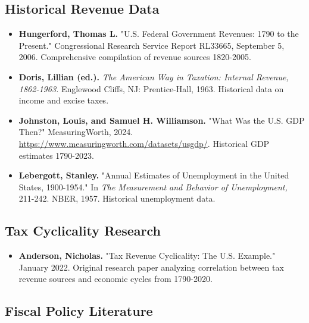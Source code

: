\documentclass[12pt,letterpaper]{article}
\begin{document}
\subsection{Historical Revenue Data}

\begin{itemize}
    \item \textbf{Hungerford, Thomas L.} "U.S. Federal Government Revenues: 1790 to the Present." Congressional Research Service Report RL33665, September 5, 2006. Comprehensive compilation of revenue sources 1820-2005.

    \item \textbf{Doris, Lillian (ed.).} \textit{The American Way in Taxation: Internal Revenue, 1862-1963.} Englewood Cliffs, NJ: Prentice-Hall, 1963. Historical data on income and excise taxes.

    \item \textbf{Johnston, Louis, and Samuel H. Williamson.} "What Was the U.S. GDP Then?" MeasuringWorth, 2024. \url{https://www.measuringworth.com/datasets/usgdp/}. Historical GDP estimates 1790-2023.

    \item \textbf{Lebergott, Stanley.} "Annual Estimates of Unemployment in the United States, 1900-1954." In \textit{The Measurement and Behavior of Unemployment,} 211-242. NBER, 1957. Historical unemployment data.
\end{itemize}

\subsection{Tax Cyclicality Research}

\begin{itemize}
    \item \textbf{Anderson, Nicholas.} "Tax Revenue Cyclicality: The U.S. Example." January 2022. Original research paper analyzing correlation between tax revenue sources and economic cycles from 1790-2020.
\end{itemize}

\subsection{Fiscal Policy Literature}
\end{document}
